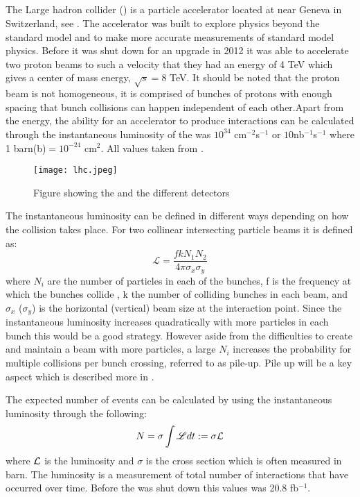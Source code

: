 \subsection{\abbrLHC}
The Large hadron collider (\abbrLHC) is a particle accelerator located at \abbrCERN near Geneva in Switzerland, see . The accelerator was built to explore physics beyond the standard model and to make more accurate measurements of standard model physics. Before it was shut down for an upgrade in 2012 it was able to accelerate two proton beams to such a velocity that they had an energy of 4 TeV which gives a center of mass energy, $\sqrt{s}=8$ TeV. It should be noted that the proton beam is not homogeneous, it is comprised of bunches of protons with enough spacing that bunch collisions can happen independent of each other.Apart from the energy, the ability for an accelerator to produce interactions can be calculated through the instantaneous luminosity of the \abbrLHC was $10^{34}$ cm$^{-2}$s$^{-1}$ or $10$nb$^{-1}$s$^{-1}$ where 1 barn(b)$=10^{-24}$ cm$^2$. All values taken from \citep{lumires}.
\begin{figure}[H]
\begin{center}
\texttt{[image: lhc.jpeg]}
\caption{Figure showing the \abbrLHC and the different detectors\citep{lhcimage}}
\label{fig:lhc}
\end{center}
\end{figure}
The instantaneous luminosity can be defined in different ways depending on how the collision takes place. For two collinear intersecting particle beams it is defined as:
\begin{equation}
\mathscr{L} = \frac{fkN_1 N_2}{4\pi \sigma_x \sigma_y}
\end{equation}
where $N_i$ are the number of particles in each of the bunches, f is the frequency at which the bunches collide , k the number of colliding bunches in each beam, and $\sigma_x$ ($\sigma_y$) is the horizontal (vertical) beam size at the interaction point. Since the instantaneous luminosity increases quadratically with more particles in each bunch this would be a good strategy. However aside from the difficulties to create and maintain a beam with more particles, a large $N_i$ increases the probability for multiple collisions per bunch crossing, referred to as pile-up. Pile up will be a key aspect which is described more in . 

The expected number of events can be calculated by using the instantaneous luminosity through the following:
\begin{equation}
N=\sigma \int \mathscr{L} dt := \sigma \mathcal{L}
\end{equation}
where $\mathcal{L}$ is the luminosity and $\sigma$ is the cross section which is often measured in barn.
The luminosity is a measurement of total number of interactions that have occurred over time. Before the \abbrLHC was shut down this values was 20.8 fb$^{-1}$.

